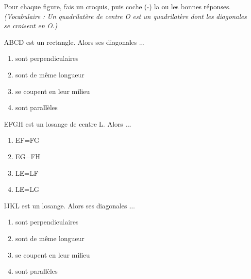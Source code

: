 \documentclass[a4paper,11pt]{report}
\begin{document}
\begin{exo}{
    Pour chaque figure, fais un croquis, puis coche (\makebox[0pt][l]{$\checkmark$}$\square$) la ou les bonnes réponses. \\
    {\small \textit{(Vocabulaire : Un quadrilatère de centre O est un quadrilatère dont les diagonales se croisent en O.)}}
    
    
    \begin{tasks}
        
        \task ABCD est un rectangle. Alors ses diagonales $\ldots$
        {\setlength\columnsep{-10pt}
        \begin{multicols}{2}
        \begin{enumerate}[label=$\square$]
            \item sont perpendiculaires
            \item sont de même longueur
            \item se coupent en leur milieu
            \item sont parallèles
        \end{enumerate}
        \end{multicols}}
        
        \task EFGH est un losange de centre L. Alors $\ldots$
        {\setlength\columnsep{-10pt}
        \begin{multicols}{4}
        \begin{enumerate}[label=$\square$]
            \item EF=FG
            \item EG=FH
            \item LE=LF
            \item LE=LG
        \end{enumerate}
        \end{multicols}}
        
        \task IJKL est un losange. Alors ses diagonales $\ldots$
       {\setlength\columnsep{-10pt}
        \begin{multicols}{2}
        \begin{enumerate}[label=$\square$]
            \item sont perpendiculaires
            \item sont de même longueur
            \item se coupent en leur milieu
            \item sont parallèles
        \end{enumerate}
        \end{multicols}}


\end{tasks}}
\end{exo}
\end{document}
